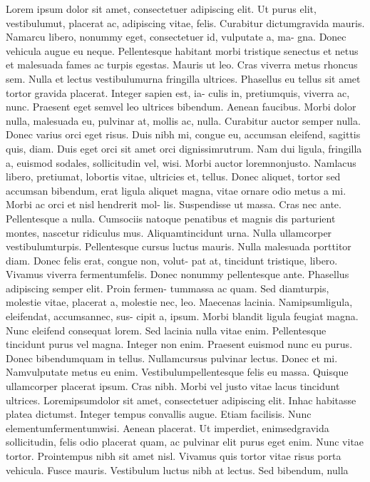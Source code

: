 Lorem ipsum dolor sit amet, consectetuer adipiscing elit. Ut purus elit,
vestibulumut, placerat ac, adipiscing vitae, felis. Curabitur dictumgravida
mauris. Namarcu libero, nonummy eget, consectetuer id, vulputate a, ma-
gna. Donec vehicula augue eu neque. Pellentesque habitant morbi tristique
senectus et netus et malesuada fames ac turpis egestas. Mauris ut leo. Cras
viverra metus rhoncus sem. Nulla et lectus vestibulumurna fringilla ultrices.
Phasellus eu tellus sit amet tortor gravida placerat. Integer sapien est, ia-
culis in, pretiumquis, viverra ac, nunc. Praesent eget semvel leo ultrices
bibendum. Aenean faucibus. Morbi dolor nulla, malesuada eu, pulvinar at,
mollis ac, nulla. Curabitur auctor semper nulla. Donec varius orci eget risus.
Duis nibh mi, congue eu, accumsan eleifend, sagittis quis, diam. Duis eget
orci sit amet orci dignissimrutrum.
Nam dui ligula, fringilla a, euismod sodales, sollicitudin vel, wisi. Morbi
auctor loremnonjusto. Namlacus libero, pretiumat, lobortis vitae, ultricies
et, tellus. Donec aliquet, tortor sed accumsan bibendum, erat ligula aliquet
magna, vitae ornare odio metus a mi. Morbi ac orci et nisl hendrerit mol-
lis. Suspendisse ut massa. Cras nec ante. Pellentesque a nulla. Cumsociis
natoque penatibus et magnis dis parturient montes, nascetur ridiculus mus.
Aliquamtincidunt urna. Nulla ullamcorper vestibulumturpis. Pellentesque
cursus luctus mauris.
Nulla malesuada porttitor diam. Donec felis erat, congue non, volut-
pat at, tincidunt tristique, libero. Vivamus viverra fermentumfelis. Donec
nonummy pellentesque ante. Phasellus adipiscing semper elit. Proin fermen-
tummassa ac quam. Sed diamturpis, molestie vitae, placerat a, molestie
nec, leo. Maecenas lacinia. Namipsumligula, eleifendat, accumsannec, sus-
cipit a, ipsum. Morbi blandit ligula feugiat magna. Nunc eleifend consequat
lorem. Sed lacinia nulla vitae enim. Pellentesque tincidunt purus vel magna.
Integer non enim. Praesent euismod nunc eu purus. Donec bibendumquam
in tellus. Nullamcursus pulvinar lectus. Donec et mi. Namvulputate metus
eu enim. Vestibulumpellentesque felis eu massa.
Quisque ullamcorper placerat ipsum. Cras nibh. Morbi vel justo vitae
lacus tincidunt ultrices. Loremipsumdolor sit amet, consectetuer adipiscing
elit. Inhac habitasse platea dictumst. Integer tempus convallis augue. Etiam
facilisis. Nunc elementumfermentumwisi. Aenean placerat. Ut imperdiet,
enimsedgravida sollicitudin, felis odio placerat quam, ac pulvinar elit purus
eget enim. Nunc vitae tortor. Prointempus nibh sit amet nisl. Vivamus quis
tortor vitae risus porta vehicula.
Fusce mauris. Vestibulum luctus nibh at lectus. Sed bibendum, nulla
